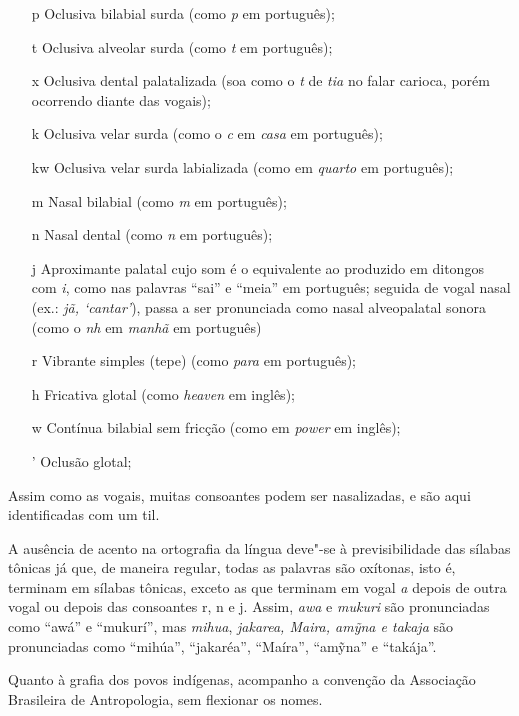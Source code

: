\begin{itemize}
\item[p] Oclusiva bilabial surda (como \emph{p} em português);

\item[t] Oclusiva alveolar surda (como \emph{t} em português);

\item[x] Oclusiva dental palatalizada (soa como o \emph{t} de \emph{tia} no falar carioca, porém ocorrendo diante das vogais);

\item[k] Oclusiva velar surda (como o \emph{c} em \emph{casa} em português);

\item[kw] Oclusiva velar surda labializada (como em \emph{quarto} em português);

\item[m] Nasal bilabial (como \emph{m} em português);

\item[n] Nasal dental (como \emph{n} em português);

\item[j] Aproximante palatal cujo som é o equivalente ao produzido em ditongos com \emph{i}, como nas palavras ``sai'' e ``meia'' em português; seguida de vogal nasal (ex.: \emph{jã, `cantar'}), passa a ser pronunciada como nasal alveopalatal sonora (como o \emph{nh} em \emph{manhã} em português)

\item[r] Vibrante simples (tepe) (como \emph{para} em português);

\item[h] Fricativa glotal (como \emph{heaven} em inglês);

\item[w] Contínua bilabial sem fricção (como em \emph{power} em inglês);

\item['] Oclusão glotal;
\end{itemize}

Assim como as vogais, muitas consoantes podem ser nasalizadas, e são
aqui identificadas com um til.

A ausência de acento na ortografia da língua deve"-se à previsibilidade
das sílabas tônicas já que, de maneira regular, todas as palavras são
oxítonas, isto é, terminam em sílabas tônicas, exceto as que terminam em
vogal \emph{a} depois de outra vogal ou depois das consoantes r, n e j.
Assim, \emph{awa} e \emph{mukuri} são pronunciadas como ``awá'' e
``mukurí'', mas \emph{mihua}, \emph{jakarea, Maira, amỹna e takaja} são
pronunciadas como ``mihúa'', ``jakaréa'', ``Maíra'', ``amỹna'' e
``takája''.

Quanto à grafia dos povos indígenas, acompanho a convenção da Associação
Brasileira de Antropologia, sem flexionar os nomes.


